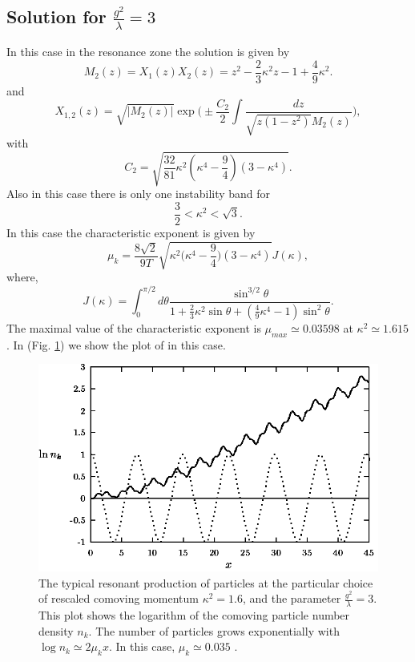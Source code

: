 \documentclass[11pt,a4paper,twoside]{book}
\begin{document}
\subsection*{Solution for $ \frac{g^{2}}{\lambda}=3 $}
In this case in the resonance zone the solution is given by
\begin{equation}
\label{Chap4:lambdaPhi4_MzsecondSolution}
M_{2}(z)=X_{1}(z)X_{2}(z)=z^{2}-\frac{2}{3}\kappa^{2}z-1+\frac{4}{9}\kappa^{2}.
\end{equation}
and
\begin{equation}
	\label{Chap4:lambdaPhi4_ChiSolution2}
	X_{1,2}(z)=\sqrt{|M_{2}(z)|}\exp\Bigg(\pm \frac{C_{2}}{2}\int \frac{dz}{\sqrt{z(1-z^{2})} M_{2}(z)}\Bigg),
\end{equation}
with
\begin{equation}
\label{Chap4:lambdaPhi4_Csolution2}
C_{2}=\sqrt{\frac{32}{81}\kappa^{2}(\kappa^{4}-\frac{9}{4})(3-\kappa^{4})}.
\end{equation}
Also in this case there is only one instability band for 
\begin{equation}
\label{Chap4:lambdaPhi4_instabilityBandSolution2}
\frac{3}{2}<\kappa^{2}<\sqrt{3}.
\end{equation}
In this case the characteristic exponent is given by
\begin{equation}
\label{Chap4:lambdaPhi4_uksolution2}
\mu_{k}=\frac{8\sqrt{2}}{9T}\sqrt{\kappa^{2}\Bigg(\kappa^{4}-\frac{9}{4}\Bigg)(3-\kappa^{4})} J(\kappa),
\end{equation}
where,
\begin{equation}
\label{Chap4:lambdaPhi4_Jk}
J(\kappa) = \int_{0}^{\pi/2}d \theta \frac{\sin^{3/2} \theta}{1+\frac{2}{3}\kappa^{2}\sin \theta + (\frac{4}{9}\kappa^{4}-1)\sin^{2}\theta}.
\end{equation}
The maximal value of the characteristic exponent is $ \mu_{max}\simeq 0.03598 $ at $ \kappa^{2}\simeq 1.615 $. In (Fig. \ref{fig:conformaltheoryfig3}) we show the plot of \cite{Chap4:ModelLambdaPhi4Reference} in this case.
\begin{figure}
	\centering
	\includegraphics[width=0.6\linewidth, height=0.3\textheight]{Images/Chap4/ConformalTheory_Fig3}
	\caption{The typical resonant production of particles at the particular choice of rescaled comoving momentum $ \kappa^{2}=1.6 $, and the parameter $ \frac{g^{2}}{\lambda}=3 $. This plot shows the logarithm of the comoving particle number density $ n_{k} $. The number of particles grows exponentially with $ \log n_{k} \simeq 2\mu_{k}x$. In this case, $\mu_{k}\simeq 0.035 $ \cite{Chap4:ModelLambdaPhi4Reference}.}
	\label{fig:conformaltheoryfig3}
\end{figure}
\end{document}
